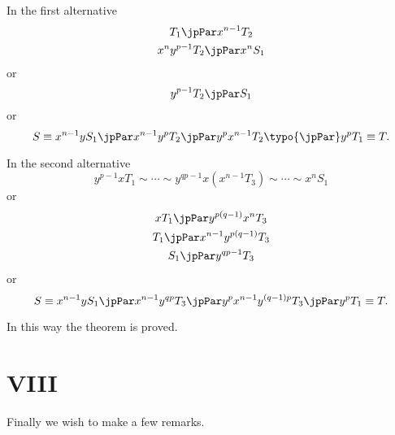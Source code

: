 In the first alternative
\begin{gather*}
T_1 \jpPar x^{n-1}T_2\\
x^ny^{p-1}T_2 \jpPar x^nS_1
\end{gather*}
or
$$y^{p-1}T_2 \jpPar S_1$$
or
$$S \equiv x^{n-1}yS_1 \jpPar x^{n-1}y^pT_2 \jpPar y^px^{n-1}T_2
\typo{\jpPar} y^pT_1 \equiv T.$$

In the second alternative
$$y^{p-1}xT_1 \sim \cdots \sim y^{qp-1}x(x^{n-1}T_3) \sim  \cdots \sim
x^nS_1$$
or
\begin{gather*}
xT_1 \jpPar y^{p(q-1)}x^nT_3\\
T_1 \jpPar x^{n-1}y^{p(q-1)}T_3 \\
S_1 \jpPar y^{qp-1}T_3
\end{gather*}
or
$$S \equiv x^{n-1}yS_1 \jpPar x^{n-1}y^{qp}T_3 \jpPar y^px^{n-1}y^{(q-1)p}T_3
\jpPar y^pT_1 \equiv T.$$

In this way the theorem is proved.

\section{VIII}
\UseGreekEquationNumbering

Finally we wish to make a few remarks.

